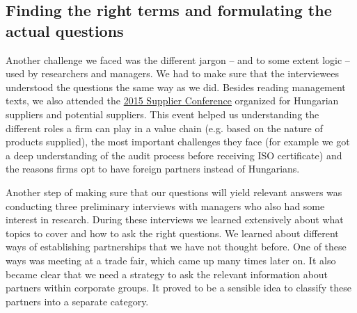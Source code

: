 \documentclass[final, dvipsnames, authoryear,12pt]{elsarticle}
\begin{document}
\subsection{Finding the right terms and formulating the actual questions}
\label{sec:terms}

Another challenge we faced was the different jargon -- and to some extent logic -- used by researchers and managers. We had to make sure that the interviewees understood the questions the same way as we did. Besides reading management texts, we also attended the \href{http://beszallito.com/}{2015 Supplier Conference} organized for Hungarian suppliers and potential suppliers. This event helped us understanding the different roles a firm can play in a value chain (e.g. based on the nature of products supplied), the most important challenges they face (for example we got a deep understanding of the audit process before receiving ISO certificate) and the reasons firms opt to have foreign partners instead of Hungarians.

Another step of making sure that our questions will yield relevant answers was conducting three preliminary interviews with managers who also had some interest in research. During these interviews we learned extensively about what topics to cover and how to ask the right questions. We learned about different ways of establishing partnerships that we have not thought before. One of these ways was meeting at a trade fair, which came up many times later on. It also became clear that we need a strategy to ask the relevant information about partners within corporate groups. It proved to be a sensible idea to classify these partners into a separate category.



\end{document}
